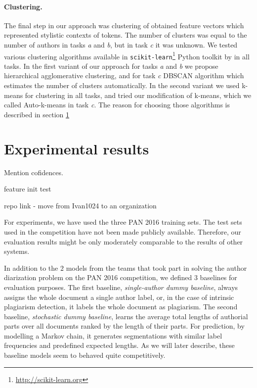 \documentclass[10pt, a4paper]{article}
\begin{document}
\paragraph{Clustering.}
The final step in our approach was clustering of obtained feature vectors which represented stylistic contexts of tokens. The number of clusters was equal to the number of authors in tasks \emph{a} and \emph{b}, but in task \emph{c} it was unknown. We tested various clustering algorithms available in \texttt{scikit-learn}\footnote{\url{http://scikit-learn.org}} Python toolkit by \citet{scikit-learn} in all tasks. In the first variant of our approach for tasks  \emph{a} and \emph{b} we propose hierarchical agglomerative clustering, and for task \emph{c} DBSCAN algorithm which estimates the number of clusters automatically. In the second variant we used k-means for clustering in all tasks, and tried our modification of k-means, which we called Auto-k-means in task \emph{c}. The reason for choosing those algorithms is described in section \ref{sec:experimental-results}



\section{Experimental results} \label{sec:experimental-results}

Mention cofidences.

feature init test

repo link - move from Ivan1024 to an organization

For experiments, we have used the three PAN 2016 training sets. The test sets used in the competition have not been made publicly available. Therefore, our evaluation results might be only moderately comparable to the results of other systems.

In addition to the $2$ models from the teams that took part in solving the author diarization problem on the PAN 2016 competition, we defined $3$ baselines for evaluation purposes. The first baseline, \emph{single-author dummy baseline}, always assigns the whole document a single author label, or, in the case of intrinsic plagiarism detection, it labels the whole document as plagiarism. The second baseline, \emph{stochastic dummy baseline}, learns the average total lengths of authorial parts over all documents ranked by the length of their parts. For prediction, by modelling a Markov chain, it generates segmentations with similar label frequencies and predefined expected lengths. As we will later describe, these baseline models seem to behaved quite competitively.
\end{document}
